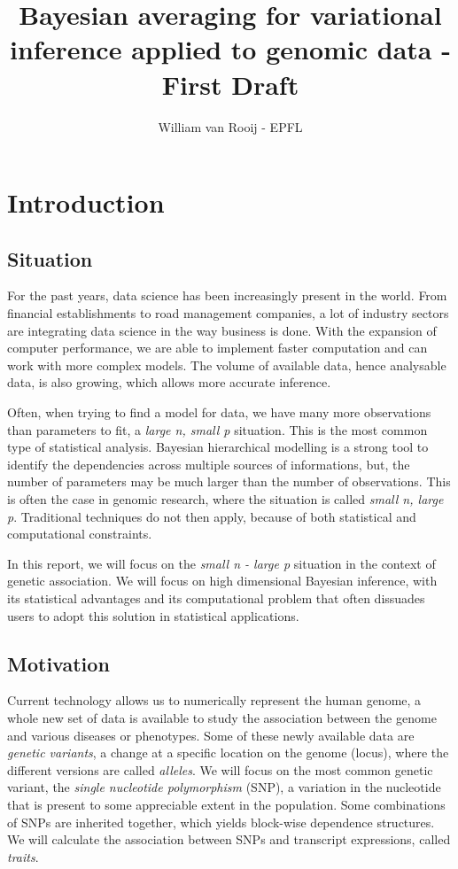 \documentclass[a4paper, 11pt]{report}
\numberwithin{equation}{chapter}
\begin{document}
\SetEndCharOfAlgoLine{}

\title{Bayesian averaging for variational inference applied to genomic data - First Draft}
\author{William van Rooij - EPFL}

\maketitle

\newpage
\tableofcontents
\newpage
\chapter{Introduction}
\section{Situation}
For the past years, data science has been increasingly present in the world. From financial establishments to road management companies, a lot of industry sectors are integrating data science in the way business is done. With the expansion of computer performance, we are able to implement faster computation and can work with more complex models. The volume of available data, hence analysable data, is also growing, which allows more accurate inference.

Often, when trying to find a model for data, we have many more observations than parameters to fit, a \textit{large n, small p} situation. This is the most common type of statistical analysis. Bayesian hierarchical modelling is a strong tool to identify the dependencies across multiple sources of informations, but, the number of parameters may be much larger than the number of observations. This is often the case in genomic research, where the situation is called \textit{small n, large p}. Traditional techniques do not then apply, because of both statistical and computational constraints.

In this report, we will focus on the \textit{small n - large p} situation in the context of genetic association. We will focus on high dimensional Bayesian inference, with its statistical advantages and its computational problem that often dissuades users to adopt this solution in statistical applications.

\section{Motivation}
Current technology allows us to numerically represent the human genome, a whole new set of data is available to study the association between the genome and various diseases or phenotypes.  Some of these newly available data are \textit{genetic variants}, a change at a specific location on  the genome (locus), where the different versions are called \textit{alleles}. We will focus on the most common genetic variant, the \textit{single nucleotide polymorphism} (SNP), a variation in the nucleotide that is present to some appreciable extent in the population. Some combinations of SNPs are inherited together, which yields block-wise dependence structures. We will calculate the association between SNPs and transcript expressions, called \textit{traits}.
\end{document}

